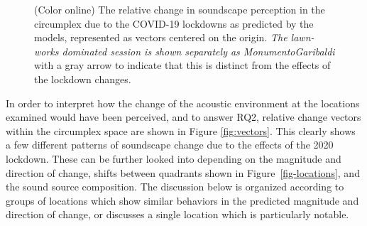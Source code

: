 \documentclass[
  authoryear,
  preprint,
  3p,
  onecolumn]{elsarticle}
\begin{document}
\begin{figure}


\caption{\label{fig-vectors}(Color online) The relative change in
soundscape perception in the circumplex due to the COVID-19 lockdowns as
predicted by the models, represented as vectors centered on the origin.
\emph{The lawn-works dominated session is shown separately as
MonumentoGaribaldi} with a gray arrow to indicate that this is distinct
from the effects of the lockdown changes.}

\end{figure}%

In order to interpret how the change of the acoustic environment at the
locations examined would have been perceived, and to answer RQ2,
relative change vectors within the circumplex space are shown in Figure
\ref{fig:vectors}. This clearly shows a few different patterns of
soundscape change due to the effects of the 2020 lockdown. These can be
further looked into depending on the magnitude and direction of change,
shifts between quadrants shown in Figure~\ref{fig-locations}, and the
sound source composition. The discussion below is organized according to
groups of locations which show similar behaviors in the predicted
magnitude and direction of change, or discusses a single location which
is particularly notable.
\end{document}
